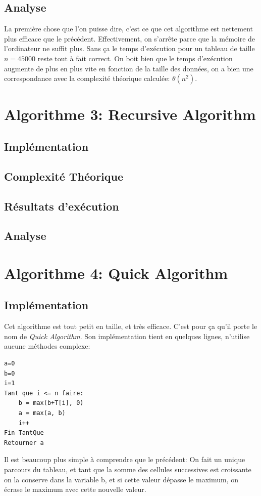 \documentclass[a4paper, 12pt]{article}
\begin{document}
\subsection{Analyse}
La première chose que l'on puisse dire, c'est ce que cet algorithme est nettement plus efficace que le précédent. Effectivement, on s'arrête parce que la mémoire de l'ordinateur ne suffit plus. Sans ça le temps d’exécution pour un tableau de taille $n=45000$ reste tout à fait correct. On boit bien que le temps d’exécution augmente de plus en plus vite en fonction de la taille des données, on a bien une correspondance avec la complexité théorique calculée: $\theta(n^2)$.


\section{Algorithme 3: Recursive Algorithm}
\subsection{Implémentation}
\subsection{Complexité Théorique}
\subsection{Résultats d’exécution}
\subsection{Analyse}

\section{Algorithme 4: Quick Algorithm}
\subsection{Implémentation}
Cet algorithme est tout petit en taille, et très efficace. C'est pour ça qu'il porte le nom de \emph{Quick Algorithm}. Son implémentation tient en quelques lignes, n'utilise aucune méthodes complexe:
\begin{verbatim}
a=0
b=0
i=1
Tant que i <= n faire:
    b = max(b+T[i], 0)
    a = max(a, b)
    i++
Fin TantQue
Retourner a
\end{verbatim}
Il est beaucoup plus simple à comprendre que le précédent: On fait un unique parcours du tableau, et tant que la somme des cellules successives est croissante on la conserve dans la variable b, et si cette valeur dépasse le maximum, on écrase le maximum avec cette nouvelle valeur.
\end{document}
